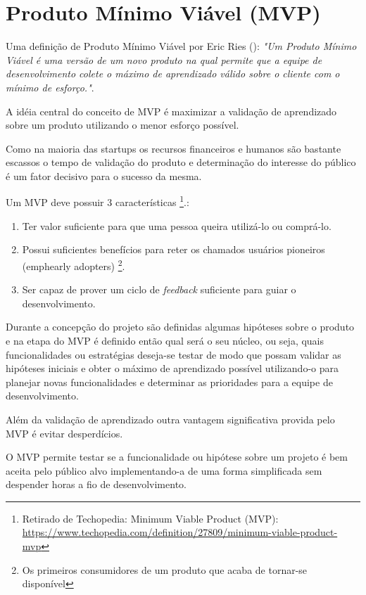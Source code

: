 \section{Produto Mínimo Viável (MVP)}

\par Uma definição de Produto Mínimo Viável por Eric Ries (\cite{ries:11}):
\emph{"Um Produto Mínimo Viável é uma versão de um novo produto na qual permite que a equipe de desenvolvimento colete o máximo de aprendizado válido sobre o cliente com o mínimo de esforço."}.
    \par A idéia central do conceito de MVP é maximizar a validação de aprendizado sobre um produto utilizando o menor esforço possível.
    \par Como na maioria das startups os recursos financeiros e humanos são bastante escassos o tempo de validação do produto e determinação do interesse do público é um fator decisivo para o sucesso da mesma.
    \par Um MVP deve possuir 3 características \footnote{ Retirado de Techopedia: Minimum Viable Product (MVP): \url{https://www.techopedia.com/definition/27809/minimum-viable-product-mvp}}.:
    \begin{enumerate}
        \item Ter valor suficiente para que uma pessoa queira utilizá-lo ou comprá-lo.
        \item Possui suficientes benefícios para reter os chamados usuários pioneiros (emph{early adopters}) \footnote{Os primeiros consumidores de um produto que acaba de tornar-se disponível}.
        \item Ser capaz de prover um ciclo de \emph{feedback} suficiente para guiar o desenvolvimento.
\end{enumerate}
    \par Durante a concepção do projeto são definidas algumas hipóteses sobre o produto e na etapa do MVP é definido então qual será o seu núcleo, ou seja, quais funcionalidades ou estratégias deseja-se testar de modo que possam validar as hipóteses iniciais e obter o máximo de aprendizado possível utilizando-o para planejar novas funcionalidades e determinar as prioridades para a equipe de desenvolvimento.
    \par Além da validação de aprendizado outra vantagem significativa provida pelo MVP é evitar desperdícios.
    \par O MVP permite testar se a funcionalidade ou hipótese sobre um projeto é bem aceita pelo público alvo implementando-a de uma forma simplificada sem despender horas a fio de desenvolvimento.

